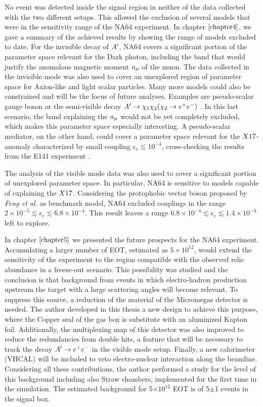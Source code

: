 No event was detected inside the signal region in neither of the data collected with the two different setups. This allowed the exclusion of several models that were in the sensitivity range of the NA64 experiment. In chapter $\ref{chapter4}$, we gave a summary of the achieved results by showing the range of models excluded to date. For the invisible decay of $A'$, NA64 covers a significant portion of the parameter space relevant for the Dark photon, including the band that would justify the anomalous magnetic moment $a_{\mu}$ of the muon.
The data collected in the invisible mode was also used to cover an unexplored region of parameter space for Axion-like and light scalar particles. Many more models could also be constrained and will be the focus of future analyses. Examples are pseudo-scalar gauge boson or the semi-visible decay $A' \to \chi_1 \chi_2 (\chi_2 \to e^+e^-)$ \cite{Mohlabeng_2019}. In this last scenario, the band explaining the $a_{\mu}$ would not be yet completely excluded, which makes this parameter space especially interesting. A pseudo-scalar mediator, on the other hand, could cover a parameter space relevant for the $X17$-anomaly characterized by small coupling $\epsilon_e \lesssim 10^{-4}$, cross-checking the results from the E141 experiment \cite{blum}.

The analysis of the visible mode data was also used to cover a significant portion of unexplored parameter space. In particular, NA64 is sensitive to models capable of explaining the $X17$. Considering the protophobic vector boson proposed by \textit{Feng et al.}\cite{Feng:2016jff} as benchmark model, NA64 excluded couplings in the range $2 \times 10^{-5} \lesssim \epsilon_e \lesssim 6.8 \times 10^{-4}$. This result leaves a range $6.8 \times 10^{-4} \lesssim \epsilon_e \lesssim 1.4 \times 10^{-3}$ left to explore.

In chapter $\ref{chapter5}$ we presented the future prospects for the NA64 experiment. Accumulating a larger number of EOT, estimated as $5 \times 10^{12}$, would extend the sensitivity of the experiment to the region compatible with the observed relic abundance in a freeze-out scenario. This possibility was studied and the conclusion is that background from events in which electro-hadron production upstream the target with a large scattering angles  will become relevant. To suppress this source, a reduction of the material of the Micromegas detector is needed. The author developed in this thesis a new design to achieve this purpose, where the Copper seal of the gas box is substitute with an aluminized Kapton foil. Additionally, the multiplexing map of this detector was also improved to reduce the redundancies from double hits, a feature that will be necessary to track the decay $A' \to e^+e^-$ in the visible mode setup. Finally, a new calorimeter (VHCAL) will be included to veto electro-nuclear interaction along the beamline. Considering all these contributions, the author performed a study for the level of this background including also Straw chambers, implemented for the first time in the simulation. The estimated background for 5$\times 10^{12}$ EOT is of 5$\pm$1 events in the signal box.

